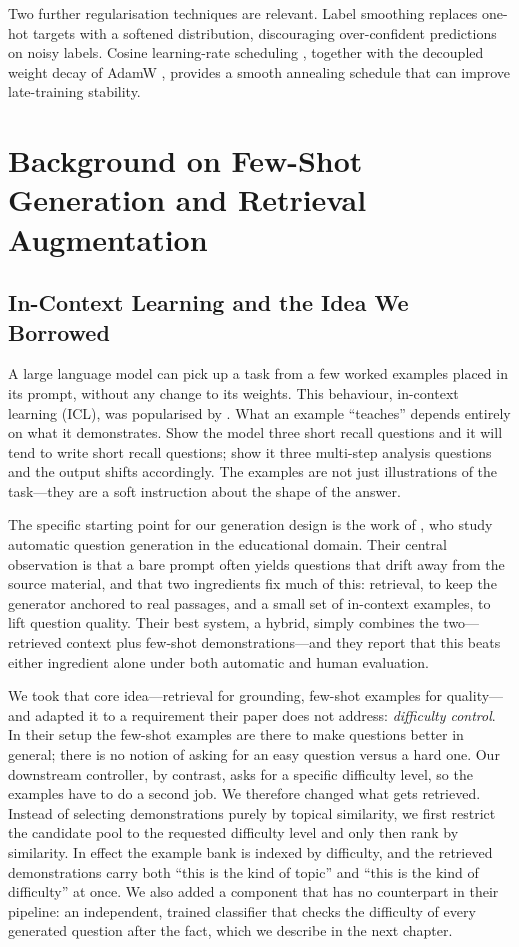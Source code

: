 \documentclass[12pt,a4paper]{report}
\begin{document}
Two further regularisation techniques are relevant. Label smoothing
\parencite{szegedy2016labelsmoothing} replaces one-hot targets with a softened
distribution, discouraging over-confident predictions on noisy labels. Cosine
learning-rate scheduling \parencite{loshchilov2017sgdr}, together with the
decoupled weight decay of AdamW \parencite{loshchilov2019adamw}, provides a
smooth annealing schedule that can improve late-training stability.

\section{Background on Few-Shot Generation and Retrieval Augmentation}

\subsection{In-Context Learning and the Idea We Borrowed}
A large language model can pick up a task from a few worked examples placed in
its prompt, without any change to its weights. This behaviour, in-context
learning (ICL), was popularised by \textcite{brown2020gpt3}. What an example
``teaches'' depends entirely on what it demonstrates. Show the model three short
recall questions and it will tend to write short recall questions; show it three
multi-step analysis questions and the output shifts accordingly. The examples are
not just illustrations of the task---they are a soft instruction about the shape
of the answer.

The specific starting point for our generation design is the work of
\textcite{maity2025icl}, who study automatic question generation in the
educational domain. Their central observation is that a bare prompt often yields
questions that drift away from the source material, and that two ingredients fix
much of this: retrieval, to keep the generator anchored to real passages, and a
small set of in-context examples, to lift question quality. Their best system, a
hybrid, simply combines the two---retrieved context plus few-shot
demonstrations---and they report that this beats either ingredient alone under
both automatic and human evaluation.

We took that core idea---retrieval for grounding, few-shot examples for
quality---and adapted it to a requirement their paper does not address:
\emph{difficulty control}. In their setup the few-shot examples are there to make
questions better in general; there is no notion of asking for an easy question
versus a hard one. Our downstream controller, by contrast, asks for a specific
difficulty level, so the examples have to do a second job. We therefore changed
what gets retrieved. Instead of selecting demonstrations purely by topical
similarity, we first restrict the candidate pool to the requested difficulty
level and only then rank by similarity. In effect the example bank is indexed by
difficulty, and the retrieved demonstrations carry both ``this is the kind of
topic'' and ``this is the kind of difficulty'' at once. We also added a component
that has no counterpart in their pipeline: an independent, trained classifier
that checks the difficulty of every generated question after the fact, which we
describe in the next chapter.
\end{document}
